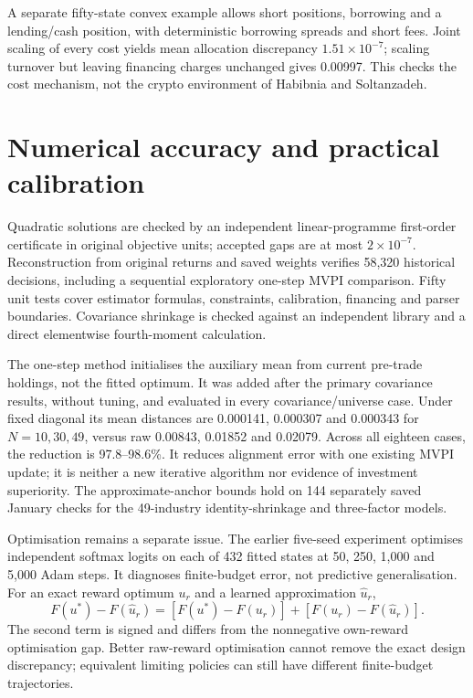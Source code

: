 \documentclass[sigconf,anonymous,review]{acmart}
\begin{document}
A separate fifty-state convex example allows short positions, borrowing and a lending/cash position, with deterministic borrowing spreads and short fees. Joint scaling of every cost yields mean allocation discrepancy $1.51\times10^{-7}$; scaling turnover but leaving financing charges unchanged gives 0.00997. This checks the cost mechanism, not the crypto environment of Habibnia and Soltanzadeh.

\section{Numerical accuracy and practical calibration}
Quadratic solutions are checked by an independent linear-programme first-order certificate in original objective units; accepted gaps are at most $2\times10^{-7}$. Reconstruction from original returns and saved weights verifies 58,320 historical decisions, including a sequential exploratory one-step MVPI comparison. Fifty unit tests cover estimator formulas, constraints, calibration, financing and parser boundaries. Covariance shrinkage is checked against an independent library and a direct elementwise fourth-moment calculation.

The one-step method initialises the auxiliary mean from current pre-trade holdings, not the fitted optimum. It was added after the primary covariance results, without tuning, and evaluated in every covariance/universe case. Under fixed diagonal its mean distances are 0.000141, 0.000307 and 0.000343 for $N=10,30,49$, versus raw 0.00843, 0.01852 and 0.02079. Across all eighteen cases, the reduction is 97.8--98.6\%. It reduces alignment error with one existing MVPI update; it is neither a new iterative algorithm nor evidence of investment superiority. The approximate-anchor bounds hold on 144 separately saved January checks for the 49-industry identity-shrinkage and three-factor models.

Optimisation remains a separate issue. The earlier five-seed experiment optimises independent softmax logits on each of 432 fitted states at 50, 250, 1,000 and 5,000 Adam steps. It diagnoses finite-budget error, not predictive generalisation. For an exact reward optimum $u_r$ and a learned approximation $\widehat u_r$,
\[
F(u^*)-F(\widehat u_r)=
[F(u^*)-F(u_r)]+[F(u_r)-F(\widehat u_r)].
\]
The second term is signed and differs from the nonnegative own-reward optimisation gap. Better raw-reward optimisation cannot remove the exact design discrepancy; equivalent limiting policies can still have different finite-budget trajectories.
\end{document}
